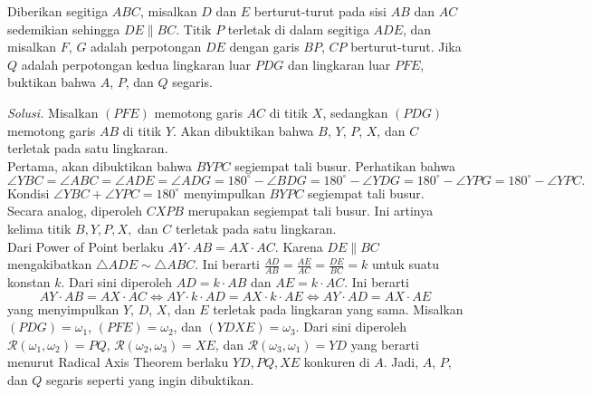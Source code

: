 \documentclass[a4paper, 11pt]{article}
\begin{document}
\newpage
\begin{tcolorbox}[title=\textbf{Soal 10}]
Diberikan segitiga $ABC$, misalkan $D$ dan $E$ berturut-turut pada sisi $AB$ dan $AC$ sedemikian sehingga $DE\parallel BC$. Titik $P$ terletak di dalam segitiga $ADE$, dan misalkan $F$, $G$ adalah perpotongan $DE$ dengan garis $BP$, $CP$ berturut-turut. Jika $Q$ adalah perpotongan kedua lingkaran luar $PDG$ dan lingkaran luar $PFE$, buktikan bahwa $A$, $P$, dan $Q$ segaris. 
\end{tcolorbox}
\noindent\textit{Solusi.} Misalkan $(PFE)$ memotong garis $AC$ di titik $X$, sedangkan $(PDG)$ memotong garis $AB$ di titik $Y$. Akan dibuktikan bahwa $B$, $Y$, $P$, $X$, dan $C$ terletak pada satu lingkaran. \\
Pertama, akan dibuktikan bahwa $BYPC$ segiempat tali busur. Perhatikan bahwa
\[\angle YBC = \angle ABC = \angle ADE =  \angle ADG = 180^\circ - \angle BDG = 180^\circ - \angle YDG = 180^\circ - \angle YPG=180^\circ-\angle YPC.\]
Kondisi $\angle YBC+\angle YPC=180^\circ$ menyimpulkan $BYPC$ segiempat tali busur. Secara analog, diperoleh $CXPB$ merupakan segiempat tali busur. Ini artinya kelima titik $B,Y,P,X,$ dan $C$ terletak pada satu lingkaran.\\
Dari Power of Point berlaku $AY\cdot AB=AX\cdot AC$. Karena $DE\parallel BC$ mengakibatkan $\triangle ADE\sim \triangle ABC$. Ini berarti $\frac{AD}{AB}=\frac{AE}{AC}=\frac{DE}{BC}=k$ untuk suatu konstan $k$. Dari sini diperoleh $AD=k\cdot AB$ dan $AE=k\cdot AC$. Ini berarti
\[AY\cdot AB=AX\cdot AC\iff AY\cdot k\cdot AD = AX\cdot k\cdot AE\iff AY\cdot AD = AX\cdot AE\]
yang menyimpulkan $Y$, $D$, $X$, dan $E$ terletak pada lingkaran yang sama. Misalkan $(PDG)=\omega_1$, $(PFE)=\omega_2$, dan $(YDXE)=\omega_3$. Dari sini diperoleh $\mathcal{R}(\omega_1,\omega_2)=PQ$, $\mathcal{R}(\omega_2,\omega_3)=XE$, dan $\mathcal{R}(\omega_3,\omega_1)=YD$ yang berarti menurut Radical Axis Theorem berlaku $YD,PQ,XE$ konkuren di $A$. Jadi, $A$, $P$, dan $Q$ segaris seperti yang ingin dibuktikan.
\begin{center}
\end{center}
\end{document}
